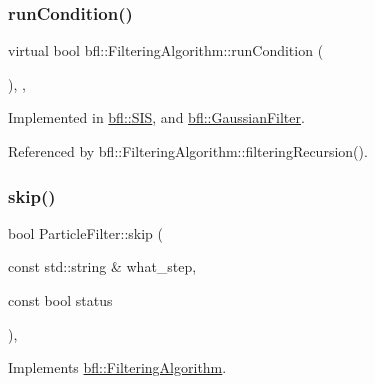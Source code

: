 \mbox{\label{classbfl_1_1FilteringAlgorithm_a5fc12882356f6906b102fbfff2bc4b7c}} 
\subsubsection{\texorpdfstring{run\+Condition()}{runCondition()}}
{\footnotesize\ttfamily virtual bool bfl\+::\+Filtering\+Algorithm\+::run\+Condition (\begin{DoxyParamCaption}{ }\end{DoxyParamCaption})\hspace{0.3cm}{\ttfamily [protected]}, {}, {\ttfamily [inherited]}}



Implemented in \mbox{\hyperlink{classbfl_1_1SIS_a669ac8eb19f6797f2735b94074727e8f}{bfl\+::\+S\+IS}}, and \mbox{\hyperlink{classbfl_1_1GaussianFilter_acf6902f6156c573560b57f10c1992b8a}{bfl\+::\+Gaussian\+Filter}}.



Referenced by bfl\+::\+Filtering\+Algorithm\+::filtering\+Recursion().

\mbox{\label{classbfl_1_1ParticleFilter_a2d7a5e7aaad179037273d35be229056d}} 
\subsubsection{\texorpdfstring{skip()}{skip()}}
{\footnotesize\ttfamily bool Particle\+Filter\+::skip (\begin{DoxyParamCaption}\item[{const std\+::string \&}]{what\+\_\+step,  }\item[{const bool}]{status }\end{DoxyParamCaption})\hspace{0.3cm}{\ttfamily [override]}, {\ttfamily [virtual]}}



Implements \mbox{\hyperlink{classbfl_1_1FilteringAlgorithm_ac8a718a614905d89d6a43bbbc70d68b2}{bfl\+::\+Filtering\+Algorithm}}.



